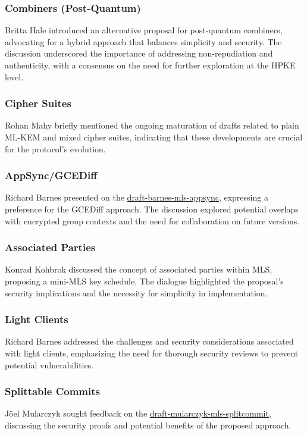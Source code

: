 \documentclass{article}
\begin{document}
\subsubsection{Combiners (Post-Quantum)}
Britta Hale introduced an alternative proposal for post-quantum combiners, advocating for a hybrid approach that balances simplicity and security. The discussion underscored the importance of addressing non-repudiation and authenticity, with a consensus on the need for further exploration at the HPKE level.

\subsubsection{Cipher Suites}
Rohan Mahy briefly mentioned the ongoing maturation of drafts related to plain ML-KEM and mixed cipher suites, indicating that these developments are crucial for the protocol's evolution.

\subsubsection{AppSync/GCEDiff}
Richard Barnes presented on the \href{https://datatracker.ietf.org/doc/html/draft-barnes-mls-appsync}{draft-barnes-mls-appsync}, expressing a preference for the GCEDiff approach. The discussion explored potential overlaps with encrypted group contexts and the need for collaboration on future versions.

\subsubsection{Associated Parties}
Konrad Kohbrok discussed the concept of associated parties within MLS, proposing a mini-MLS key schedule. The dialogue highlighted the proposal's security implications and the necessity for simplicity in implementation.

\subsubsection{Light Clients}
Richard Barnes addressed the challenges and security considerations associated with light clients, emphasizing the need for thorough security reviews to prevent potential vulnerabilities.

\subsubsection{Splittable Commits}
Jöel Mularczyk sought feedback on the \href{https://datatracker.ietf.org/doc/html/draft-mularczyk-mls-splitcommit}{draft-mularczyk-mls-splitcommit}, discussing the security proofs and potential benefits of the proposed approach.
\end{document}
